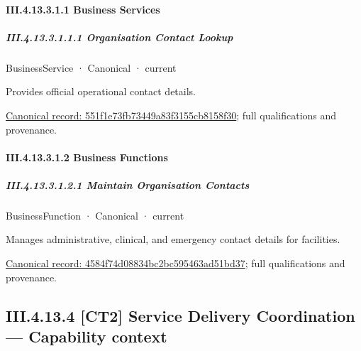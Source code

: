 \paragraph*{III.4.13.3.1.1 Business Services}
\label{navigation:III.4.13.3.1.1}

\subparagraph*{III.4.13.3.1.1.1 Organisation Contact Lookup}
\label{navigation:III.4.13.3.1.1.1}

\label{element:551f1e73fb73449a83f3155cb8158f30}
{\small BusinessService · Canonical · current}\par

Provides official operational contact details.


{\footnotesize \href{../../../../../../../continuum/business/business-service/551f1e73fb73449a83f3155cb8158f30.md}{Canonical record: 551f1e73fb73449a83f3155cb8158f30}; full qualifications and provenance.}\par
\paragraph*{III.4.13.3.1.2 Business Functions}
\label{navigation:III.4.13.3.1.2}

\subparagraph*{III.4.13.3.1.2.1 Maintain Organisation Contacts}
\label{navigation:III.4.13.3.1.2.1}

\label{element:4584f74d08834bc2bc595463ad51bd37}
{\small BusinessFunction · Canonical · current}\par

Manages administrative, clinical, and emergency contact details for facilities.


{\footnotesize \href{../../../../../../../continuum/business/business-function/4584f74d08834bc2bc595463ad51bd37.md}{Canonical record: 4584f74d08834bc2bc595463ad51bd37}; full qualifications and provenance.}\par
\subsection*{III.4.13.4 [CT2] Service Delivery Coordination — Capability context}
\label{navigation:III.4.13.4}

